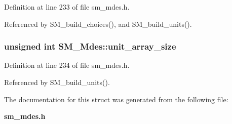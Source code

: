 Definition at line 233 of file sm\_\-mdes.h.

Referenced by SM\_\-build\_\-choices(), and SM\_\-build\_\-units().
\subsubsection{\setlength{\rightskip}{0pt plus 5cm}unsigned int \bf{SM\_\-Mdes::unit\_\-array\_\-size}}\label{structSM__Mdes_d3624bdbb415ea33aeb26718a615c112}




Definition at line 234 of file sm\_\-mdes.h.

Referenced by SM\_\-build\_\-units().

The documentation for this struct was generated from the following file:\begin{CompactItemize}
\item 
\bf{sm\_\-mdes.h}\end{CompactItemize}
